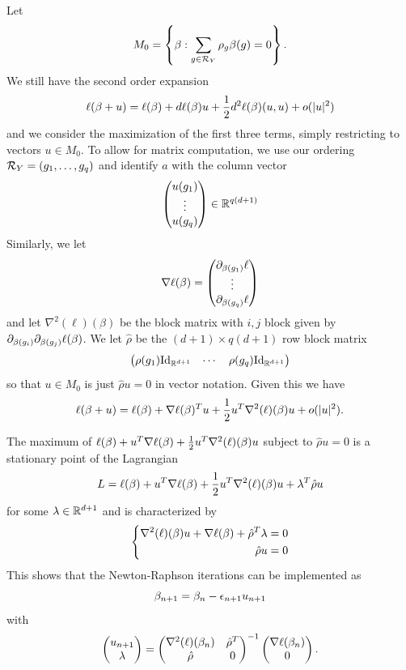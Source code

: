 Let
\[
M_0 = \left\{  \beta: \sum_{g\in {\mathcal R}_Y} \rho_g \beta(g) = 0 \right\}.
\]
We still have the second order expansion
\[
\ell(\beta+ u) = \ell(\beta) +  d \ell(\beta)u  + \frac12  d^2\ell(\beta) (u,u) + o(|u|^2)
\]
and we consider the maximization of  the first three terms, simply restricting to vectors $u\in M_0$. To allow for matrix computation, we use our ordering ${\mathcal R}_Y = (g_1, \ldots, g_q)$ and identify $a$ with the column vector
\[
\begin{pmatrix}
u(g_1) \\\vdots\\u(g_q)
\end{pmatrix}
\in {\mathbb{R}}^{q(d+1)}
\]
Similarly, we let 
\[
\nabla \ell (\beta) = \begin{pmatrix}
\partial_{\beta(g_1)}\ell \\\vdots\\ \partial_{\beta(g_q)}\ell
\end{pmatrix}
\]
and let
$\nabla^2(\ell)(\beta)$ be the block matrix with $i,j$ block given by $\partial_{\beta(g_i)}\partial_{\beta(g_j)}\ell (\beta)$. We let $\hat \rho$ be the $(d+1)\times q(d+1)$ row block matrix 
\[
\begin{pmatrix}
\rho(g_1) \Id[d+1] & \cdots & \rho(g_q) \Id[d+1]
\end{pmatrix}
\]
so that $u\in M_0$ is just $\hat\rho u = 0$ in vector notation. Given this we have
\[
\ell(\beta+ u) = \ell(\beta) +  \nabla\ell(\beta)^T u  + \frac12 u^T  \nabla^2(\ell)(\beta) u + o(|u|^2).
\]

The maximum of $\ell(\beta) +  u^T\nabla \ell(\beta)  +  \frac12 u^T \nabla^2(\ell)(\beta) u$ subject to $ \hat \rho u = 0$ 
is a stationary point of the Lagrangian
\[
L = \ell(\beta) +  u^T\nabla \ell(\beta)  +  \frac12 u^T \nabla^2(\ell)(\beta) u + \lambda^T \hat \rho u 
\]
for some $\lambda\in {\mathbb{R}}^{d+1}$ and is characterized by 
\[
\left\{
\begin{aligned}
\nabla^2(\ell)(\beta) u + \nabla \ell(\beta) + \hat \rho^T \lambda = 0\\
\hat \rho u = 0
\end{aligned}
\right.
\]
This shows that the Newton-Raphson iterations can be implemented as  
\begin{equation}
\beta_{n+1} = \beta_n - \epsilon_{n+1} u_{n+1}
\label{eq:log.reg.nr.1}
\end{equation}
with
\begin{equation}
\label{eq:log.reg.nr.2}
\begin{pmatrix} u_{n+1}\\ \lambda\end{pmatrix} = \begin{pmatrix}
\nabla^2(\ell)(\beta_n) & \hat \rho^T\\ \hat \rho & 0
\end{pmatrix}^{-1} \begin{pmatrix}
\nabla \ell(\beta_n) \\ 0
\end{pmatrix}.
\end{equation}

